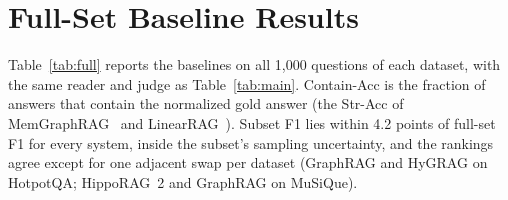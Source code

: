 \documentclass[runningheads]{llncs}
\begin{document}
\appendix
\section{Full-Set Baseline Results}
\label{app:full}

Table~\ref{tab:full} reports the baselines on all 1{,}000 questions of each dataset, with the same reader and judge as Table~\ref{tab:main}. Contain-Acc is the fraction of answers that contain the normalized gold answer (the Str-Acc of MemGraphRAG~\cite{wu2026memgraphrag} and LinearRAG~\cite{zhuang2025linearrag}). Subset F1 lies within 4.2 points of full-set F1 for every system, inside the subset's sampling uncertainty, and the rankings agree except for one adjacent swap per dataset (GraphRAG and HyGRAG on HotpotQA; HippoRAG~2 and GraphRAG on MuSiQue).

\begin{table}[h]
\centering
\caption{Baselines on the full 1{,}000-question sets (shared reader and judge).}
\label{tab:full}
\end{table}

%
%


\end{document}
